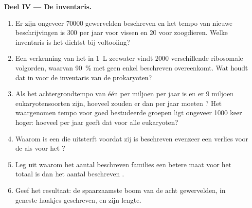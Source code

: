 \begin{problem}
\medskip
\noindent\textbf{Deel IV --- De inventaris.}
\begin{enumerate}[resume]
  \item Er zijn ongeveer \num{70000}  gewervelden beschreven en het
        tempo van nieuwe beschrijvingen is \num{300} per jaar voor vissen
        en \num{20} voor zoogdieren. Welke inventaris is het dichtst bij
        voltooiing?
  \item Een verkenning van het  in \qty{1}{L} zeewater vindt
        \num{2000} verschillende ribosomale volgorden, waarvan
        \qty{90}{\%} met geen enkel beschreven  overeenkomt. Wat
        houdt dat in voor de inventaris van de prokaryoten?
  \item Als het achtergrondtempo van  één  per miljoen per
        jaar is en er \num{9} miljoen eukaryotensoorten zijn, hoeveel
        zouden er dan per jaar moeten ? Het waargenomen tempo
        voor goed bestudeerde groepen ligt ongeveer \num{1000} keer
        hoger: hoeveel per jaar geeft dat voor alle eukaryoten?
  \item Waarom is een  die uitsterft voordat zij is beschreven
        evenzeer een verlies voor de  als voor het ?
  \item Leg uit waarom het aantal beschreven families een betere maat voor
        het totaal is dan het aantal beschreven .
  \item Geef het resultaat: de spaarzaamste boom van de acht gewervelden,
        in geneste haakjes geschreven, en zijn lengte.
\end{enumerate}
\end{problem}
